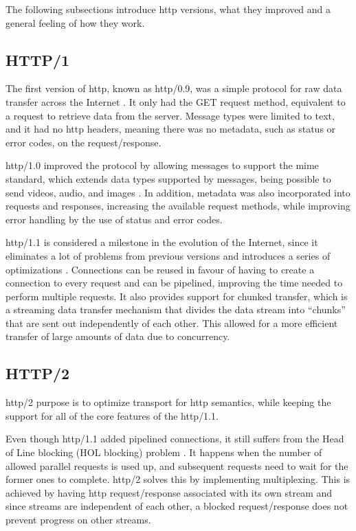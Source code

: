 The following subsections introduce \gls{http} versions, what they improved and a general feeling of how they work.

\subsection{HTTP/1}

The first version of \gls{http}, known as \gls{http}/0.9, was a simple protocol for raw data transfer across the Internet \cite{rfc2616}. It only had the GET request method, equivalent to a request to retrieve data from the server. Message types were limited to text, and it had no \gls{http} headers, meaning there was no metadata, such as status or error codes, on the request/response.

\gls{http}/1.0 improved the protocol by allowing messages to support the \gls{mime} standard, which extends data types supported by messages, being possible to send videos, audio, and images \cite{rfc2616}. In addition, metadata was also incorporated into requests and responses, increasing the available request methods, while improving error handling by the use of status and error codes.

\gls{http}/1.1 is considered a milestone in the evolution of the Internet, since it eliminates a lot of problems from previous versions and introduces a series of optimizations \cite{what_is_http}. Connections can be reused in favour of having to create a connection to every request and can be pipelined, improving the time needed to perform multiple requests. It also provides support for chunked transfer, which is a streaming data transfer mechanism that divides the data stream into “chunks” that are sent out independently of each other. This allowed for a more efficient transfer of large amounts of data due to concurrency.

\subsection{HTTP/2}

\gls{http}/2 purpose is to optimize transport for \gls{http} semantics, while keeping the support for all of the core features of the \gls{http}/1.1.

Even though \gls{http}/1.1 added pipelined connections, it still suffers from the Head of Line blocking (HOL blocking) problem \cite{rfc7540}. It happens when the number of allowed parallel requests is used up, and subsequent requests need to wait for the former ones to complete. \gls{http}/2 solves this by implementing multiplexing. This is achieved by having \gls{http} request/response associated with its own stream and since streams are independent of each other, a blocked request/response does not prevent progress on other streams.

